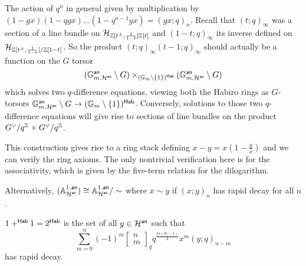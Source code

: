 The action of $q^{n}$ in general given by multiplication by $(1-gx)(1-qgx)\dots(1-q^{n-1}gx)=(gx;q)_{n}$. Recall that $(t;q)_{\infty}$ was a section of a line bundle on $\mathcal{H}_{\mathbb{Z}[t^{\pm},\frac{1}{1-t}]\mathbb{Z}[t]}$ and $(1-t;q)_{\infty}$ its inverse defined on $\mathcal{H}_{\mathbb{Z}[t^{\pm},\frac{1}{1-t}]/\mathbb{Z}[1-t]}$. So the product $(t;q)_{\infty}(t-1;q)_{\infty}$ should actually be a function on the $G$ torsor $$(\mathbb{G}_{m,\mathcal{H}^{\mathsf{an}}}^{\mathsf{an}}\setminus G)\times_{(\mathbb{G}_{m}\setminus\{1\})^{\mathsf{Hab}}} (\mathbb{G}_{m,\mathcal{H}^{\mathsf{an}}}^{\mathsf{an}}\setminus G)$$ which solves two $q$-difference equations, viewing both the Habiro rings as $G$-torsors $\mathbb{G}_{m,\mathcal{H}^{\mathsf{an}}}^{\mathsf{an}}\setminus G\to (\mathbb{G}_{m}\setminus\{1\})^{\mathsf{Hab}}$. Conversely, solutions to those two $q$-difference equations will give rise to sections of line bundles on the product $G^{\vee}/q^{\mathbb{Z}}\times G^{\vee}/q^{\mathbb{Z}}$. 

This construction gives rise to a ring stack defining $x-y=x(1-\frac{y}{x})$ and we can verify the ring axioms. The only nontrivial verification here is for the associativity, which is given by the five-term relation for the dilogarithm. 
\begin{remark}
    Alternatively, $(\mathbb{A}^{1,\mathsf{an}}_{\mathcal{H}^{\mathsf{an}}})\cong\mathbb{A}^{1,\mathsf{an}}_{\mathcal{H}^{\mathsf{an}}}/\sim$ where $x\sim y$ if $(x;y)_{n}$ has rapid decay for all $n$. 
\end{remark}
\begin{example}
    $1+^{\mathsf{Hab}}1=2^{\mathsf{Hab}}$ is the set of all $y\in\mathcal{H}^{\mathsf{an}}$ such that
    $$\sum_{m=0}^{n}(-1)^{m}\begin{bmatrix}
        n \\ m
    \end{bmatrix}_{q}q^{\frac{m(m-1)}{2}}x^{m}(y;q)_{n-m}$$
    has rapid decay.
\end{example}